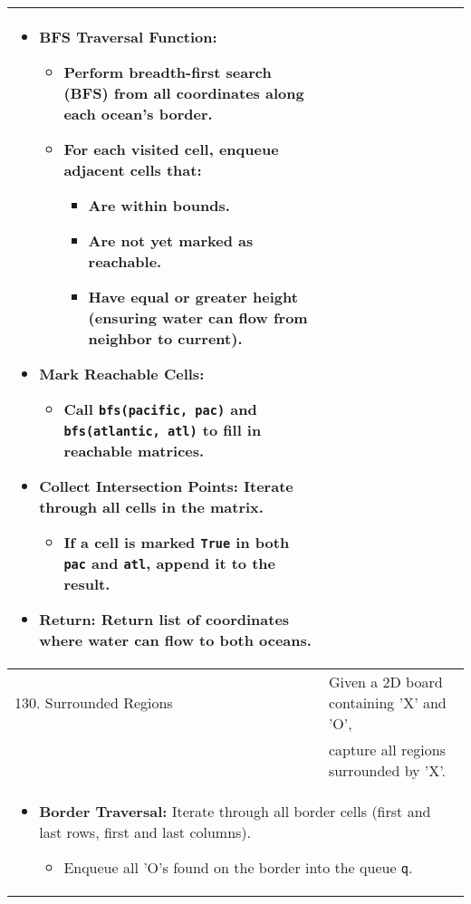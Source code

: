 \begin{summary}
\begin{center}
\begin{tabular}{ll}
{\begin{itemize}
                    \item \textbf{BFS Traversal Function:}
                    \begin{itemize}
                        \item Perform breadth-first search (BFS) from all coordinates along each ocean's border.
                        \item For each visited cell, enqueue adjacent cells that:
                        \begin{itemize}
                            \item Are within bounds.
                            \item Are not yet marked as reachable.
                            \item Have equal or greater height (ensuring water can flow from neighbor to current).
                        \end{itemize}
                    \end{itemize}
                
                    \item \textbf{Mark Reachable Cells:}
                    \begin{itemize}
                        \item Call \texttt{bfs(pacific, pac)} and \texttt{bfs(atlantic, atl)} to fill in reachable matrices.
                    \end{itemize}
                
                    \item \textbf{Collect Intersection Points:} Iterate through all cells in the matrix.
                    \begin{itemize}
                        \item If a cell is marked \texttt{True} in both \texttt{pac} and \texttt{atl}, append it to the result.
                    \end{itemize}
                
                    \item \textbf{Return:} Return list of coordinates where water can flow to both oceans.
                \end{itemize}                             
            } \\
            \midrule
            130. Surrounded Regions & Given a 2D board containing 'X' and 'O', \\
            & capture all regions surrounded by 'X'. \\
            \multicolumn{2}{p{\linewidth}}{
                \begin{itemize}                
                    \item \textbf{Border Traversal:} Iterate through all border cells (first and last rows, first and last columns).
                    \begin{itemize}
                        \item Enqueue all 'O's found on the border into the queue \texttt{q}.
                    \end{itemize}
                

\end{itemize}}
\end{tabular}
\end{center}
\end{summary}
